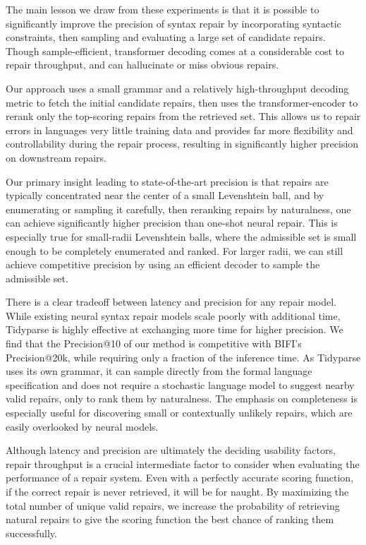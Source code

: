 \documentclass[sigplan,review,acmsmall,nonacm,screen,anonymous]{acmart}\settopmatter{printfolios=false,printccs=false,printacmref=false}
\begin{document}
The main lesson we draw from these experiments is that it is possible to significantly improve the precision of syntax repair by incorporating syntactic constraints, then sampling and evaluating a large set of candidate repairs. Though sample-efficient, transformer decoding comes at a considerable cost to repair throughput, and can hallucinate or miss obvious repairs.

Our approach uses a small grammar and a relatively high-throughput decoding metric to fetch the initial candidate repairs, then uses the transformer-encoder to rerank only the top-scoring repairs from the retrieved set. This allows us to repair errors in languages very little training data and provides far more flexibility and controllability during the repair process, resulting in significantly higher precision on downstream repairs.

Our primary insight leading to state-of-the-art precision is that repairs are typically concentrated near the center of a small Levenshtein ball, and by enumerating or sampling it carefully, then reranking repairs by naturalness, one can achieve significantly higher precision than one-shot neural repair. This is especially true for small-radii Levenshtein balls, where the admissible set is small enough to be completely enumerated and ranked. For larger radii, we can still achieve competitive precision by using an efficient decoder to sample the admissible set.

There is a clear tradeoff between latency and precision for any repair model. While existing neural syntax repair models scale poorly with additional time, Tidyparse is highly effective at exchanging more time for higher precision. We find that the Precision@10 of our method is competitive with BIFI's Precision@20k, while requiring only a fraction of the inference time. As Tidyparse uses its own grammar, it can sample directly from the formal language specification and does not require a stochastic language model to suggest nearby valid repairs, only to rank them by naturalness. The emphasis on completeness is especially useful for discovering small or contextually unlikely repairs, which are easily overlooked by neural models.

Although latency and precision are ultimately the deciding usability factors, repair throughput is a crucial intermediate factor to consider when evaluating the performance of a repair system. Even with a perfectly accurate scoring function, if the correct repair is never retrieved, it will be for naught. By maximizing the total number of unique valid repairs, we increase the probability of retrieving natural repairs to give the scoring function the best chance of ranking them successfully.
\end{document}
